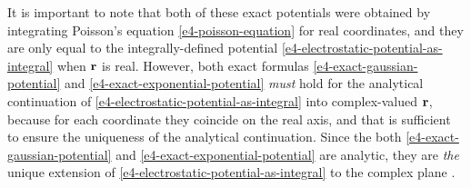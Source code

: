 It is important to note that both of these exact potentials were obtained by integrating Poisson's equation \eqref{e4-poisson-equation} for real coordinates, and they are only equal to the integrally-defined potential \eqref{e4-electrostatic-potential-as-integral} when $\vb{r}$ is real. However, both exact formulas \eqref{e4-exact-gaussian-potential} and \eqref{e4-exact-exponential-potential} \textit{must} hold for the analytical continuation of \eqref{e4-electrostatic-potential-as-integral} into complex-valued $\vb{r}$, because for each coordinate they coincide on the real axis, and that is sufficient to ensure the uniqueness of the analytical continuation. Since the both \eqref{e4-exact-gaussian-potential} and \eqref{e4-exact-exponential-potential} are analytic, they are \textit{the} unique extension of \eqref{e4-electrostatic-potential-as-integral} to the complex plane \cite[\S108]{churchill_complex_variables}.


\vspace{5mm}


